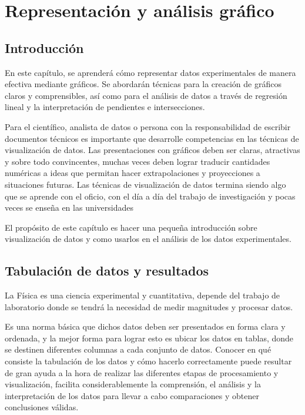\chapter{Representaci\'on y an\'alisis gr\'afico}

\section{Introducci\'on}

En este cap\'itulo, se aprender\'a c\'omo representar datos experimentales de manera efectiva mediante gr\'aficos. Se abordar\'an t\'ecnicas para la creaci\'on de gr\'aficos claros y comprensibles, as\'i como para el an\'alisis de datos a trav\'es de regresi\'on lineal y la interpretaci\'on de pendientes e intersecciones.

Para el cient\'ifico, analista de datos o persona con la responsabilidad  de escribir documentos t\'ecnicos es importante que desarrolle competencias en las t\'ecnicas de visualizaci\'on de datos. Las presentaciones con gr\'aficos deben ser claras, atractivas y sobre todo convincentes, muchas veces deben lograr traducir cantidades num\'ericas a ideas que permitan hacer extrapolaciones y proyecciones a situaciones futuras. Las t\'ecnicas de visualizaci\'on de datos termina siendo algo que se aprende con el oficio, con el d\'ia a d\'ia del trabajo de investigaci\'on y pocas veces se ense\~na en las universidades

El prop\'osito de este cap\'itulo es hacer una peque\~na introducci\'on sobre visualizaci\'on de datos y como usarlos en el an\'alisis de los datos experimentales. 

\section{Tabulaci\'on de datos y resultados}

La F\'isica es una ciencia experimental y cuantitativa, depende del trabajo de laboratorio donde se tendr\'a la necesidad de medir magnitudes y procesar datos.

Es una norma b\'asica que dichos datos deben ser presentados en forma clara y ordenada, y la mejor forma para lograr esto es ubicar los datos en tablas, donde se destinen diferentes columnas a cada conjunto de datos. Conocer en qu\'e consiste la tabulaci\'on de los datos y c\'omo hacerlo correctamente puede resultar de gran ayuda a la hora de realizar las diferentes etapas de  procesamiento y visualizaci\'on, facilita considerablemente la comprensi\'on, el an\'alisis y la interpretaci\'on de los datos para llevar a cabo comparaciones y obtener conclusiones v\'alidas. 

